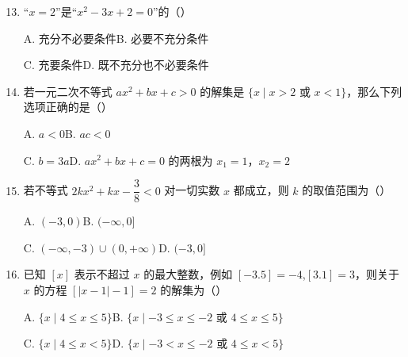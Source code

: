 \documentclass[a4paper,11pt]{article}
\begin{document}
\begin{enumerate}
\setcounter{enumi}{12}

\item “$x=2$”是“$x^2-3x+2=0$”的\mbox{（\quad）}

\keepwithprev
A. 充分不必要条件\qquad B. 必要不充分条件

C. 充要条件\qquad D. 既不充分也不必要条件

\ifanswer
{}
\fi

\item 若一元二次不等式 $ax^2+bx+c>0$ 的解集是 $\{x\mid x>2\text{ 或 }x<1\}$，那么下列选项正确的是\mbox{（\quad）}

\keepwithprev
A. $a<0$\qquad B. $ac<0$

C. $b=3a$\qquad D. $ax^2+bx+c=0$ 的两根为 $x_1=1$，$x_2=2$

\ifanswer
\solbegin
{}
\solend
\fi

\item 若不等式 $2kx^2+kx-\dfrac38<0$ 对一切实数 $x$ 都成立，则 $k$ 的取值范围为\mbox{（\quad）}

\keepwithprev
A. $(-3,0)$\qquad B. $(-\infty,0]$

C. $(-\infty,-3)\cup(0,+\infty)$\qquad D. $(-3,0]$

\ifanswer
\solbegin
{}
\step{综合①②，实数 $k$ 的取值范围是 $(-3,0]$. 故选 $D$.}
\solend
\fi

\item 已知 $[x]$ 表示不超过 $x$ 的最大整数，例如 $[-3.5]=-4$,$[3.1]=3$，则关于 $x$ 的方程 $[|x-1|-1]=2$ 的解集为\mbox{（\quad）}  %

\keepwithprev
A. $\{x\mid4\leqslant x\leqslant5\}$\qquad B. $\{x\mid-3\leqslant x\leqslant-2\text{ 或 }4\leqslant x\leqslant5\}$

C. $\{x\mid4\leqslant x<5\}$\qquad D. $\{x\mid-3<x\leqslant-2\text{ 或 }4\leqslant x<5\}$

\ifanswer
\solbegin
{}  %
\solend
\fi

\end{enumerate}
\end{document}
